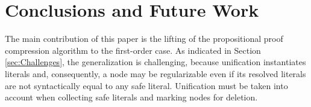 \vspace{-0.25cm}
\section{Conclusions and Future Work}\label{sec:conclusion}

The main contribution of this paper is the lifting of the propositional proof compression algorithm {\RPI} to the first-order case. As indicated in Section \ref{sec:Challenges}, the generalization is challenging, because unification instantiates literals and, consequently, a node may be regularizable even if its resolved literals are not syntactically equal to any safe literal. Unification must be taken into account when collecting safe literals and marking nodes for deletion.



